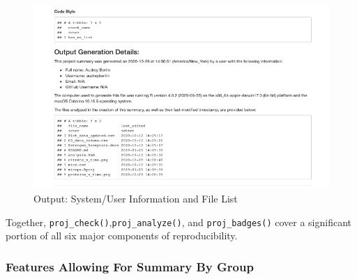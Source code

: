 \documentclass[12pt,twoside]{reedthesis}
\begin{document}
\begin{figure}
\includegraphics[width=1\linewidth]{figure/badges-2} \caption{Output: System/User Information and File List}\label{fig:badges-2}
\end{figure}
Together, \texttt{proj\_check()},\texttt{proj\_analyze()}, and
\texttt{proj\_badges()} cover a significant portion of all six major
components of reproducibility.

\subsubsection{Features Allowing For Summary By
Group}\label{features-allowing-for-summary-by-group}
\end{document}
